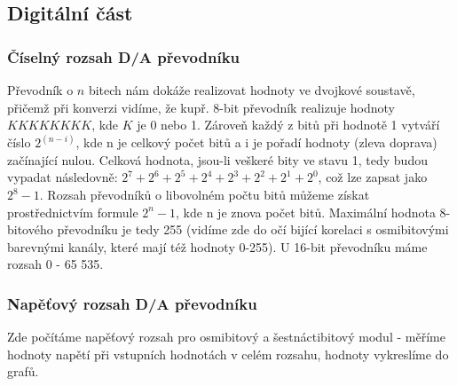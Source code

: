 \documentclass[czech,11pt,a4paper]{article}
\begin{document}
   \subsection{Digitální část}
   \subsubsection{Číselný rozsah D/A převodníku}
   Převodník o \textbf{$n$} bitech nám dokáže realizovat hodnoty ve dvojkové soustavě, přičemž při konverzi vidíme, že kupř. 8-bit převodník realizuje hodnoty $K K K K K K K K$, kde $K$ je 0 nebo 1. Zároveň každý z bitů při hodnotě 1 vytváří číslo $2^(n-i)$, kde n je celkový počet bitů a i je pořadí hodnoty (zleva doprava) začínající nulou. Celková hodnota, jsou-li veškeré bity ve stavu 1, tedy budou vypadat následovně: $2^7 + 2^6 + 2^5 + 2^4 + 2^3 + 2^2 + 2^1 + 2^0$, což lze zapsat jako $2^8 -1$. Rozsah převodníků o libovolném počtu bitů můžeme získat prostřednictvím formule $2^n -1$, kde n je znova počet bitů. Maximální hodnota 8-bitového převodníku je tedy 255 (vidíme zde do očí bijící korelaci s osmibitovými barevnými kanály, které mají též hodnoty 0-255). U 16-bit převodníku máme rozsah 0 - 65 535.
   
   \subsubsection{Napěťový rozsah D/A převodníku}
   Zde počítáme napěťový rozsah pro osmibitový a šestnáctibitový modul - měříme hodnoty napětí při vstupních hodnotách v celém rozsahu, hodnoty vykreslíme do grafů.
   
\end{document}
